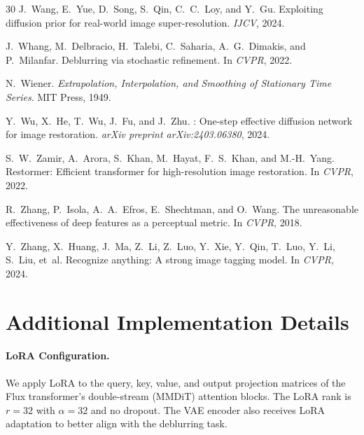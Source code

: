 \documentclass{article}
\begin{document}
\begin{thebibliography}{30}
J.~Wang, E.~Yue, D.~Song, S.~Qin, C.~C.~Loy, and Y.~Gu.
\newblock Exploiting diffusion prior for real-world image super-resolution.
\newblock \emph{IJCV}, 2024.

J.~Whang, M.~Delbracio, H.~Talebi, C.~Saharia, A.~G.~Dimakis, and P.~Milanfar.
\newblock Deblurring via stochastic refinement.
\newblock In \emph{CVPR}, 2022.

N.~Wiener.
\newblock \emph{Extrapolation, Interpolation, and Smoothing of Stationary Time Series}.
\newblock MIT Press, 1949.

Y.~Wu, X.~He, T.~Wu, J.~Fu, and J.~Zhu.
: One-step effective diffusion network for image restoration.
\newblock \emph{arXiv preprint arXiv:2403.06380}, 2024.

S.~W.~Zamir, A.~Arora, S.~Khan, M.~Hayat, F.~S.~Khan, and M.-H.~Yang.
\newblock Restormer: Efficient transformer for high-resolution image restoration.
\newblock In \emph{CVPR}, 2022.

R.~Zhang, P.~Isola, A.~A.~Efros, E.~Shechtman, and O.~Wang.
\newblock The unreasonable effectiveness of deep features as a perceptual metric.
\newblock In \emph{CVPR}, 2018.

Y.~Zhang, X.~Huang, J.~Ma, Z.~Li, Z.~Luo, Y.~Xie, Y.~Qin, T.~Luo, Y.~Li, S.~Liu, et~al.
\newblock Recognize anything: A strong image tagging model.
\newblock In \emph{CVPR}, 2024.

\end{thebibliography}

\newpage
\appendix

\section{Additional Implementation Details}
\label{app:implementation}

\paragraph{LoRA Configuration.}
We apply LoRA to the query, key, value, and output projection matrices of the Flux transformer's double-stream (MMDiT) attention blocks. The LoRA rank is $r=32$ with $\alpha=32$ and no dropout. The VAE encoder also receives LoRA adaptation to better align with the deblurring task.
\end{document}
